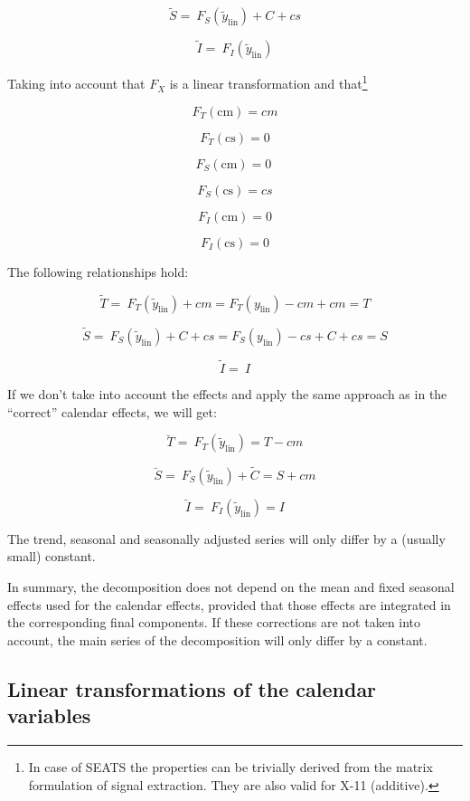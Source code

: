 \documentclass[
  letterpaper,
  DIV=11,
  numbers=noendperiod]{scrreprt}
\begin{document}
\[\widetilde{S} = \ F_{S}\left( {\widetilde{y}}_{\text{lin}} \right) + C + cs\]

\[\widetilde{I} = \ F_{I}\left( {\widetilde{y}}_{\text{lin}} \right)\]

Taking into account that \(F_{X}\) is a linear transformation and
that\footnote{In case of SEATS the properties can be trivially derived
  from the matrix formulation of signal extraction. They are also valid
  for X-11 (additive).}

\[F_{T}\left( \text{cm} \right) = cm\]

\[F_{T}\left( \text{cs} \right) = 0\]

\[F_{S}\left( \text{cm} \right) = 0\ \]

\[F_{S}\left( \text{cs} \right) = cs\]

\[F_{I}\left( \text{cm} \right) = 0\]

\[F_{I}\left( \text{cs} \right) = 0\]

The following relationships hold:

\[\widetilde{T} = \ F_{T}\left( {\widetilde{y}}_{\text{lin}} \right) + cm = F_{T}\left( y_{\text{lin}} \right) - cm + cm = T\]

\[\widetilde{S} = \ F_{S}\left( {\widetilde{y}}_{\text{lin}} \right) + C + cs = F_{S}\left( y_{\text{lin}} \right) - cs + C + cs = S\]

\[\widetilde{I} = \ I\]

If we don't take into account the effects and apply the same approach as
in the ``correct'' calendar effects, we will get:

\[\breve{T} = \ F_{T}\left( {\widetilde{y}}_{\text{lin}} \right) = T - cm\]

\[\breve{S} = \ F_{S}\left( {\widetilde{y}}_{\text{lin}} \right) + \widetilde{C} = S + cm\]

\[\breve{I} = \ F_{I}\left( {\widetilde{y}}_{\text{lin}} \right) = I\]

The trend, seasonal and seasonally adjusted series will only differ by a
(usually small) constant.

In summary, the decomposition does not depend on the mean and fixed
seasonal effects used for the calendar effects, provided that those
effects are integrated in the corresponding final components. If these
corrections are not taken into account, the main series of the
decomposition will only differ by a constant.

\hypertarget{linear-transformations-of-the-calendar-variables}{%
\subsection{Linear transformations of the calendar
variables}\label{linear-transformations-of-the-calendar-variables}}
\end{document}
